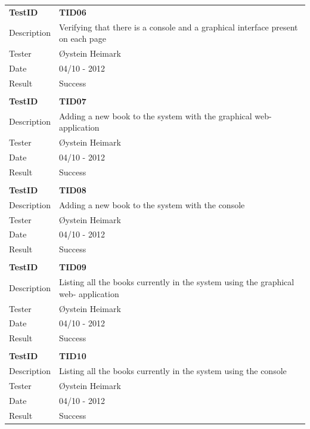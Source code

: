 \begin{table}
\begin{tabular}{ l p{13cm} }
\bf{TestID}		&\bf{TID06}			\\
Description	&Verifying that there is a console and a graphical interface present on each page\\
Tester		&Øystein Heimark	\\
Date			&04/10 - 2012	\\
Result		&Success			\\
\hline \\ [-2.0ex]

\bf{TestID}		&\bf{TID07}			\\
Description	&Adding a new book to the system with the graphical web- application	\\
Tester		&Øystein Heimark	\\
Date			&04/10 - 2012	\\
Result		&Success			\\
\hline \\ [-2.0ex]

\bf{TestID}		&\bf{TID08}			\\
Description	&Adding a new book to the system with the console	\\
Tester		&Øystein Heimark	\\
Date			&04/10 - 2012	\\
Result		&Success				\\
\hline \\ [-2.0ex]

\bf{TestID}		&\bf{TID09}			\\
Description	&Listing all the books currently in the system using the graphical web- application	\\
Tester		&Øystein Heimark	\\
Date			&04/10 - 2012	\\
Result		&Success				\\
\hline \\ [-2.0ex]

\bf{TestID}		&\bf{TID10}			\\
Description	&Listing all the books currently in the system using the console	\\
Tester		&Øystein Heimark	\\
Date			&04/10 - 2012	\\
Result		&Success			\\
\hline
\end{tabular}
\label{table:sp1testresults}
\end{table}

